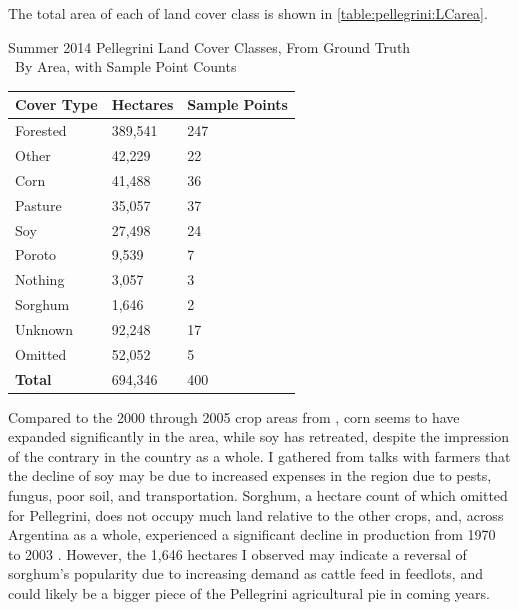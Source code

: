 The total area of each of land cover class is shown in \autoref{table:pellegrini:LCarea}.
\begin{sstable}
  \centering
  \caption[Summer 2014 Pellegrini Land Cover Classes, From Ground Truth]{Summer 2014 Pellegrini Land Cover Classes, From Ground Truth\\~By Area, with Sample Point Counts}
  \label{table:pellegrini:LCarea}
  \begin{tabu}{XX[r]X[r]}
    \toprule
    \textbf{Cover Type} & \textbf{Hectares} & \textbf{Sample Points} \\
    \midrule
    Forested & 389,541 & 247 \\
    Other & 42,229 & 22 \\
    Corn & 41,488 & 36 \\
    Pasture & 35,057 & 37 \\
    Soy & 27,498 & 24 \\
    Poroto & 9,539 & 7 \\
    Nothing & 3,057 & 3 \\
    Sorghum & 1,646 & 2 \\
    \midrule
    Unknown & 92,248 & 17 \\
    Omitted & 52,052 & 5 \\
    \midrule
    \textbf{Total} & 694,346 & 400 \\
    \bottomrule
  \end{tabu}
\end{sstable}
Compared to the 2000 through 2005 crop areas from \textcite{volante2005analisis}, corn seems to have expanded significantly in the area, while soy has retreated, despite the impression of the contrary in the country as a whole. I gathered from talks with farmers that the decline of soy may be due to increased expenses in the region due to pests, fungus, poor soil, and transportation. Sorghum, a hectare count of which \citeauthor{volante2005analisis} omitted for Pellegrini, does not occupy much land relative to the other crops, and, across Argentina as a whole, experienced a significant decline in production from 1970 to 2003 \autocite{paruelo2005expansion}. However, the 1,646 hectares I observed may indicate a reversal of sorghum's popularity due to increasing demand as cattle feed in feedlots, and could likely be a bigger piece of the Pellegrini agricultural pie in coming years.

